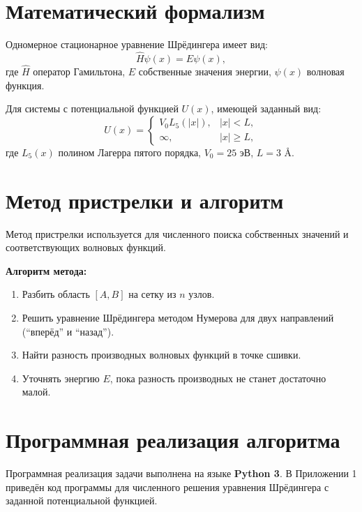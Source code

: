 \documentclass[a4paper, 12pt]{article}
\begin{document}
\section{Математический формализм}
Одномерное стационарное уравнение Шрёдингера имеет вид:
\begin{equation}
    \hat{H}\psi(x) = E\psi(x),
\end{equation}
где $\hat{H}$ \textendash{} оператор Гамильтона, $E$ \textendash{} собственные значения энергии, $\psi(x)$ \textendash{} волновая функция.

Для системы с потенциальной функцией \( U(x) \), имеющей заданный вид:
\begin{equation}
U(x) = \begin{cases} V_0 L_5(|x|), & |x| < L, \\ \infty, & |x| \geq L, \end{cases}
\end{equation}
где $L_5(x)$ \textendash{} полином Лагерра пятого порядка, $V_0 = 25$ эВ, $L = 3$ \AA.

\section{Метод пристрелки и алгоритм}
Метод пристрелки используется для численного поиска собственных значений и соответствующих волновых функций.

\textbf{Алгоритм метода:}
\begin{enumerate}
    \item Разбить область $[A, B]$ на сетку из $n$ узлов.
    \item Решить уравнение Шрёдингера методом Нумерова для двух направлений (``вперёд'' и ``назад'').
    \item Найти разность производных волновых функций в точке сшивки.
    \item Уточнять энергию $E$, пока разность производных не станет достаточно малой.
\end{enumerate}

\section{Программная реализация алгоритма}
Программная реализация задачи выполнена на языке \textbf{Python 3}. В Приложении 1 приведён код программы для численного решения уравнения Шрёдингера с заданной потенциальной функцией.
\end{document}
